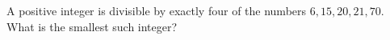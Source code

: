 A positive integer is divisible by exactly four of the numbers $6,15,20,21,70$. What is the smallest such integer?
